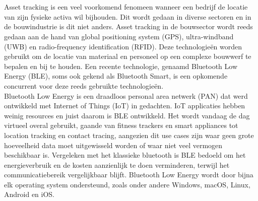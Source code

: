 
\chapter{}%
\label{ch:inleiding}

%

Asset tracking is een veel voorkomend fenomeen wanneer een bedrijf de locatie van zijn fysieke activa wil bijhouden. Dit wordt gedaan in diverse sectoren en in de bouwindustrie is dit niet anders. Asset tracking in de bouwsector wordt reeds gedaan aan de hand van global positioning system (GPS), ultra-windband (UWB) en radio-frequency identification (RFID). Deze technologieën worden gebruikt om de locatie van materiaal en personeel op een complexe bouwwerf te bepalen en bij te houden. Een recente technologie, genaamd Bluetooth Low Energy (BLE), soms ook gekend als Bluetooth Smart, is een opkomende concurrent voor deze reeds gebruikte technologieën. \\

Bluetooth Low Energy is een draadloos personal area netwerk (PAN) dat werd ontwikkeld met Internet of Things (IoT) in gedachten. IoT applicaties hebben weinig resources en juist daarom is BLE ontwikkeld. Het wordt vandaag de dag virtueel overal gebruikt, gaande van fitness trackers en smart appliances tot location tracking en contact tracing, aangezien dit use cases zijn waar geen grote hoeveelheid data moet uitgewisseld worden of waar niet veel vermogen beschikbaar is. Vergeleken met het klassieke bluetooth is BLE bedoeld om het energieverbruik en de kosten aanzienlijk te doen verminderen, terwijl het communicatiebereik vergelijkbaar blijft. Bluetooth Low Energy wordt door bijna elk operating system ondersteund, zoals onder andere Windows, macOS, Linux,  Android en iOS.\\

